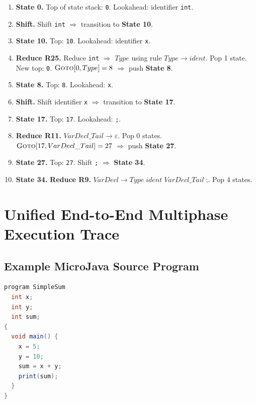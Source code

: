 \documentclass[11pt,a4paper]{article}
\begin{document}
\begin{tcolorbox}[colback=LightBlack!20, colframe=PrimaryBlack, arc=3pt, boxrule=0.6pt,
  title={\small\textbf{Step-by-Step LR(1) Stack Trace — \texttt{int x;}}}]
\begin{enumerate}[leftmargin=*, label=\textbf{Step \arabic*.}]
  \item \textbf{State 0.} Top of state stack: \texttt{0}. Lookahead: identifier \texttt{int}.
  \item \textbf{Shift.} Shift \texttt{int} $\Rightarrow$ transition to \textbf{State 10}.
  \item \textbf{State 10.} Top: \texttt{10}. Lookahead: identifier \texttt{x}.
  \item \textbf{Reduce R25.} Reduce \texttt{int} $\Rightarrow$ $Type$ using rule $Type \rightarrow \textit{ident}$. Pop 1 state. New top: \texttt{0}. $\textsc{Goto}[0, Type] = 8$ $\Rightarrow$ push \textbf{State 8}.
  \item \textbf{State 8.} Top: \texttt{8}. Lookahead: \texttt{x}.
  \item \textbf{Shift.} Shift identifier \texttt{x} $\Rightarrow$ transition to \textbf{State 17}.
  \item \textbf{State 17.} Top: \texttt{17}. Lookahead: \texttt{;}.
  \item \textbf{Reduce R11.} $VarDecl\_Tail \rightarrow \varepsilon$. Pop 0 states. $\textsc{Goto}[17, VarDecl\_Tail] = 27$ $\Rightarrow$ push \textbf{State 27}.
  \item \textbf{State 27.} Top: \texttt{27}. Shift \texttt{;} $\Rightarrow$ \textbf{State 34}.
  \item \textbf{State 34.} \textbf{Reduce R9.} $VarDecl \rightarrow Type\;\textit{ident}\;VarDecl\_Tail\;\texttt{;}$. Pop 4 states.
\end{enumerate}
\end{tcolorbox}

\newpage
\section{Unified End-to-End Multiphase Execution Trace}

\subsection{Example MicroJava Source Program}

\begin{lstlisting}[language=Java, caption={Example MicroJava Program — \texttt{SimpleSum.mj}}]
program SimpleSum
  int x;
  int y;
  int sum;
{
  void main() {
    x = 5;
    y = 10;
    sum = x + y;
    print(sum);
  }
}
\end{lstlisting}
\end{document}
